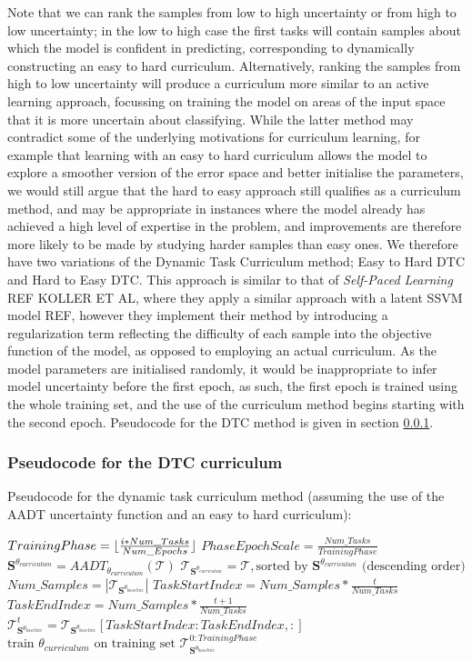 Note that we can rank the samples from low to high uncertainty or from high to low uncertainty; in the low to high case the first tasks will contain samples about which the model is confident in predicting, corresponding to dynamically constructing an easy to hard curriculum. Alternatively, ranking the samples from high to low uncertainty will produce a curriculum more similar to an active learning approach, focussing on training the model on areas of the input space that it is more uncertain about classifying. While the latter method may contradict some of the underlying motivations for curriculum learning, for example that learning with an easy to hard curriculum allows the model to explore a smoother version of the error space and better initialise the parameters, we would still argue that the hard to easy approach still qualifies as a curriculum method, and may be appropriate in instances where the model already has achieved a high level of expertise in the problem, and improvements are therefore more likely to be made by studying harder samples than easy ones.  We therefore have two variations of the Dynamic Task Curriculum method; Easy to Hard DTC and Hard to Easy DTC. This approach is similar to that of \textit{Self-Paced Learning} REF KOLLER ET AL, where they apply a similar approach with a latent SSVM model REF, however they implement their method by introducing a regularization term reflecting the difficulty of each sample into the objective function of the model, as opposed to employing an actual curriculum. As the model parameters are initialised randomly, it would be inappropriate to infer model uncertainty before the first epoch, as such, the first epoch is trained using the whole training set, and the use of the curriculum method begins starting with the second epoch.  Pseudocode for the DTC method is given in section \ref{sec:DTCPseudocode}.

\subsubsection{Pseudocode for the DTC curriculum}\label{sec:DTCPseudocode}
Pseudocode for the dynamic task curriculum method (assuming the use of the AADT uncertainty function and an easy to hard curriculum):
\begin{algorithmic}
\STATE $TrainingPhase = \lfloor\frac{i*Num\_Tasks}{Num\_Epochs}\rfloor$
\STATE $PhaseEpochScale = \frac{Num\_Tasks}{TrainingPhase}$
\STATE $\mathbf{S}^{\theta_{curriculum}} = AADT_{\theta_{curriculum}}(\mathcal{T})$
\STATE $\mathcal{T}_{\mathbf{S}^{\theta_{curriculum}}} = \mathcal{T}, \text{sorted by } \mathbf{S}^{\theta_{curriculum}} \text{ (descending order)}$ 
\STATE $Num\_Samples = |\mathcal{T}_{\mathbf{S}^{\theta_{baseline}}}|$
\STATE $TaskStartIndex = Num\_Samples*\frac{t}{Num\_Tasks} $
\STATE $TaskEndIndex = Num\_Samples*\frac{t+1}{Num\_Tasks} $
\STATE $\mathcal{T}^{t}_{\mathbf{S}^{\theta_{baseline}}} = \mathcal{T}_{\mathbf{S}^{\theta_{baseline}}}[TaskStartIndex:TaskEndIndex,:] $
\ENDFOR
\STATE $\text{train }  \theta_{curriculum} \text{ on training set } \mathcal{T}^{0:TrainingPhase}_{\mathbf{S}^{\theta_{baseline}}} $
\ENDFOR
\ENDFOR
\end{algorithmic}


